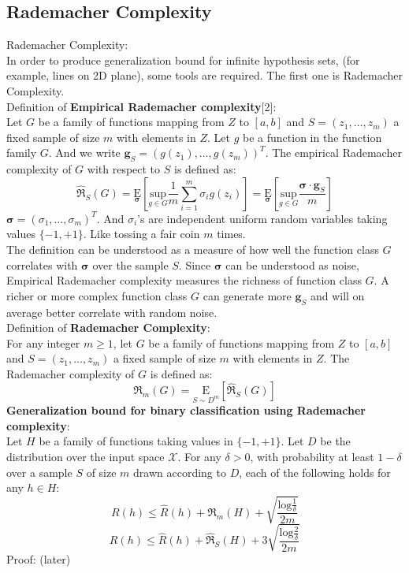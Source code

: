 \documentclass[12pt]{article}
\theoremstyle{definition}
\theoremstyle{remark}
\numberwithin{equation}{section}
\begin{document}
\subsection{Rademacher Complexity}
Rademacher Complexity: \\[0.2cm]
In order to produce generalization bound for infinite hypothesis sets, (for example, lines on 2D plane), some tools are required. The first one is Rademacher Complexity. \\[0.2cm]
Definition of \textbf{Empirical Rademacher complexity}[2]: \\[0.2cm]
Let $G$ be a family of functions mapping from $Z$ to $[a,b]$ and $S=(z_1,\dots,z_m)$ a fixed sample of size $m$ with elements in $Z$. Let $g$ be a function in the function family $G$. And we write $\mathbf{g}_S = (g(z_1),\dots,g(z_m))^T$. The empirical Rademacher complexity of $G$ with respect to $S$ is defined as:
\[\mathfrak{\widehat{R}}_S(G)=\underset{\mathbf{\sigma}}{\text{E}}[\underset{g \in G}{\text{sup}}\frac{1}{m}\sum_{i=1}^{m}\sigma_ig(z_i)]=\underset{\mathbf{\sigma}}{\text{E}}[\underset{g \in G}{\text{sup}}\frac{\mathbf{\sigma}\cdot\mathbf{g}_S}{m}]\]
$\mathbf{\sigma} = (\sigma_1,\dots, \sigma_m)^T$. And $\sigma_i$'s are independent uniform random variables taking values $\{-1,+1\}$. Like tossing a fair coin $m$ times. \\[0.2cm]
The definition can be understood as a measure of how well the function class $G$ correlates with $\mathbf{\sigma}$ over the sample $S$. Since $\mathbf{\sigma}$ can be understood as noise, Empirical Rademacher complexity measures the richness of function class $G$. A richer or more complex function class $G$ can generate more $\mathbf{g}_S$ and will on average better correlate with random noise.\\[0.2cm]
Definition of \textbf{Rademacher Complexity}: \\[0.2cm]
For any integer $m\geq 1$, let $G$ be a family of functions mapping from $Z$ to $[a,b]$ and $S=(z_1,\dots,z_m)$ a fixed sample of size $m$ with elements in $Z$. The Rademacher complexity of $G$ is defined as:
\[\mathfrak{R}_m(G)=\underset{S \sim D^m}{\text{E}}[\mathfrak{\widehat{R}}_S(G)]\]
\textbf{Generalization bound for binary classification using Rademacher complexity}:\\[0.2cm]
Let $H$ be a family of functions taking values in $\{-1,+1\}$. Let $D$ be the distribution over the input space $\mathcal{X}$. For any $\delta > 0$, with probability at least $1-\delta$ over a sample $S$ of size $m$ drawn according to $D$, each of the following holds for any $h \in H$:
\[R(h)\leq \widehat{R}(h) + \mathfrak{R}_m(H) + \sqrt{\frac{\mathrm{log}\frac{1}{\delta}}{2m}}\]
\[R(h)\leq \widehat{R}(h) + \mathfrak{\widehat{R}}_S(H) + 3\sqrt{\frac{\mathrm{log}\frac{2}{\delta}}{2m}}\]
Proof: (later)
\end{document}
